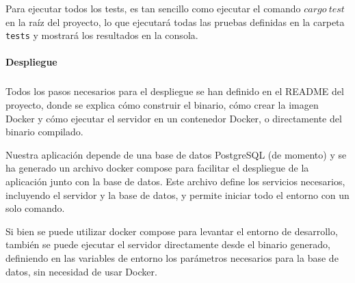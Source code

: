 Para ejecutar todos los tests, es tan sencillo como ejecutar el comando $cargo\ test$ en la raíz del proyecto, lo que ejecutará todas las pruebas definidas en la carpeta \texttt{tests} y mostrará los resultados en la consola.

\paragraph{Despliegue}
\subparagraph{}

Todos los pasos necesarios para el despliegue se han definido en el README del proyecto, donde se explica cómo construir el binario, cómo crear la imagen Docker y cómo ejecutar el servidor en un contenedor Docker, o directamente del binario compilado.

Nuestra aplicación depende de una base de datos PostgreSQL (de momento) y se ha generado un archivo docker compose para facilitar el despliegue de la aplicación junto con la base de datos. Este archivo define los servicios necesarios, incluyendo el servidor y la base de datos, y permite iniciar todo el entorno con un solo comando.

Si bien se puede utilizar docker compose para levantar el entorno de desarrollo, también se puede ejecutar el servidor directamente desde el binario generado, definiendo en las variables de entorno los parámetros necesarios para la base de datos, sin necesidad de usar Docker.
